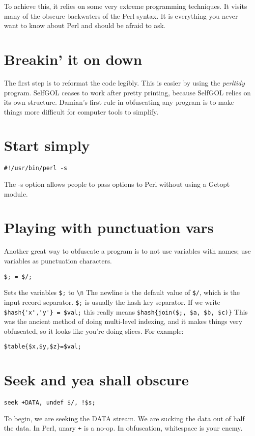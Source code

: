 \documentclass{article}
\begin{document}
To achieve this, it relies on some very extreme programming techniques.  It
visits many of the obscure backwaters of the Perl syntax.  It is
everything you never want to know about Perl and should be afraid to
ask.

\section{Breakin' it on down}
The first step is to reformat the code legibly.  This is easier by using
the \emph{perltidy} program.  SelfGOL ceases to work after pretty printing,
because SelfGOL relies on its own structure.  Damian's first rule 
in obfuscating any program is to make things more difficult for computer
tools to simplify.

\section{Start simply}
\begin{verbatim}
#!/usr/bin/perl -s
\end{verbatim}
The -s option allows people to pass options to Perl without using a
Getopt module.

\section{Playing with punctuation vars}
Another great way to obfuscate a program is to not use variables with
names; use variables as punctuation
characters.  
\begin{verbatim}
$; = $/;
\end{verbatim}Sets the variables \verb"$;" to
\verb"\n"
The newline is the default value of \verb"$/", which is the input
record separator.
\verb"$;" is usually the hash key separator.
If we write 
\verb"$hash{'x','y'} = $val;" this really means 
\verb"$hash{join($;, $a, $b, $c)}"
This was the ancient method of doing multi-level indexing, and it makes
things very obfuscated, so it looks like you're doing slices.  For
example:
\begin{verbatim}
$table{$x,$y,$z}=$val;
\end{verbatim}

\section{Seek and yea shall obscure}
\begin{verbatim}
seek +DATA, undef $/, !$s;
\end{verbatim}
To begin, we are seeking the DATA stream.  We are sucking the data out
of half the data.  In Perl, unary \verb"+" is a no-op.  In obfuscation, 
whitespace is your enemy.
\end{document}
